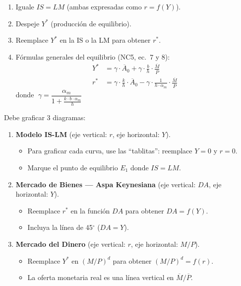 \documentclass[11pt,a4paper]{article}
\newcommand{\barvar}[1]{\overline{#1}}
\begin{document}
\begin{hintbox}
\begin{enumerate}[leftmargin=1.5em, itemsep=4pt]
    \item Iguale $IS = LM$ (ambas expresadas como $r = f(Y)$).
    \item Despeje $Y^*$ (producci\'{o}n de equilibrio).
    \item Reemplace $Y^*$ en la IS o la LM para obtener $r^*$.

    \item F\'{o}rmulas generales del equilibrio (NC5, ec.\ 7 y 8):
    \begin{align*}
        Y^* &= \gamma \cdot \barvar{A}_0 + \gamma \cdot \frac{b}{h} \cdot \frac{\barvar{M}}{\barvar{P}} \\[6pt]
        r^* &= \gamma \cdot \frac{k}{h} \cdot \barvar{A}_0 - \gamma \cdot \frac{1}{h \cdot \alpha_m} \cdot \frac{\barvar{M}}{\barvar{P}}
    \end{align*}
    donde $\;\gamma = \dfrac{\alpha_m}{1 + \frac{k \cdot b \cdot \alpha_m}{h}}$
\end{enumerate}
\end{hintbox}

\vspace{0.4cm}

\begin{hintbox}
Debe graficar 3 diagramas:
\begin{enumerate}[leftmargin=1.5em, itemsep=4pt]
    \item \textbf{Modelo IS-LM} (eje vertical: $r$, eje horizontal: $Y$).
    \begin{itemize}[leftmargin=1em]
        \item Para graficar cada curva, use las ``tablitas'': reemplace $Y=0$ y $r=0$.
        \item Marque el punto de equilibrio $E_1$ donde $IS = LM$.
    \end{itemize}

    \item \textbf{Mercado de Bienes --- Aspa Keynesiana} (eje vertical: $DA$, eje horizontal: $Y$).
    \begin{itemize}[leftmargin=1em]
        \item Reemplace $r^*$ en la funci\'{o}n $DA$ para obtener $DA = f(Y)$.
        \item Incluya la l\'{i}nea de 45$^\circ$ ($DA = Y$).
    \end{itemize}

    \item \textbf{Mercado del Dinero} (eje vertical: $r$, eje horizontal: $M/P$).
    \begin{itemize}[leftmargin=1em]
        \item Reemplace $Y^*$ en $(M/P)^d$ para obtener $(M/P)^d = f(r)$.
        \item La oferta monetaria real es una l\'{i}nea vertical en $\barvar{M}/\barvar{P}$.
    \end{itemize}
\end{enumerate}
\end{hintbox}
\end{document}
